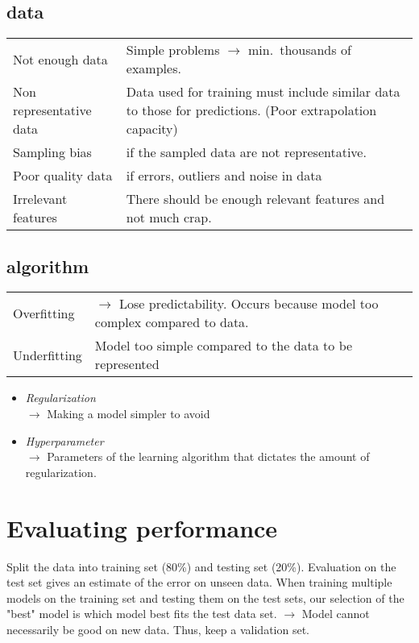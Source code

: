 \documentclass{book}
\begin{document}
\subsection{data}
\begin{tabular}{p{}|p{}}
  Not enough data & Simple problems $\rightarrow$ min.\ thousands of examples.\\
  Non representative data & Data used for training must include similar data to those for predictions. (Poor extrapolation capacity) \\
  Sampling bias & if the sampled data are not representative. \\
  Poor quality data & if errors, outliers and noise in data \\
  Irrelevant features & There should be enough relevant features and not much crap.
\end{tabular}

\subsection{algorithm}
\begin{tabular}{p{}|p{}}
  Overfitting & $\rightarrow$ Lose predictability. Occurs because model too complex compared to data. \\
  Underfitting & Model too simple compared to the data to be represented
\end{tabular}

\begin{itemize}
  \item \textit{Regularization}\\
    $\rightarrow$ Making a model simpler to avoid
  \item \textit{Hyperparameter}\\
    $\rightarrow$ Parameters of  the learning algorithm that dictates the amount of regularization.
\end{itemize}

\section{Evaluating performance}

Split the data into training set (80\%) and testing set (20\%).
Evaluation on the test set gives an estimate of the error on unseen data.
When training multiple models on the training set and testing them on the test sets, our selection of the "best" model is which model best fits the test data set.
$\rightarrow$ Model cannot necessarily be good on new data.
Thus, keep a validation set.
\end{document}
